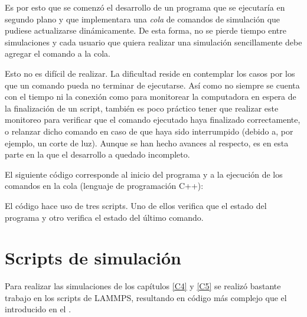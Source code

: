 Es por esto que se comenzó el desarrollo de un programa que se ejecutaría en segundo plano y que implementara una \textit{cola} de comandos de simulación que pudiese actualizarse dinámicamente. De esta forma, no se pierde tiempo entre simulaciones y cada usuario que quiera realizar una simulación sencillamente debe agregar el comando a la cola.

Esto no es difícil de realizar. La dificultad reside en contemplar los casos por los que un comando pueda no terminar de ejecutarse. Así como no siempre se cuenta con el tiempo ni la conexión como para monitorear la computadora en espera de la finalización de un script, también es poco práctico tener que realizar este monitoreo para verificar que el comando ejecutado haya finalizado correctamente, o relanzar dicho comando en caso de que haya sido interrumpido (debido a, por ejemplo, un corte de luz). Aunque se han hecho avances al respecto, es en esta parte en la que el desarrollo a quedado incompleto.

El siguiente código corresponde al inicio del programa y a la ejecución de los comandos en la cola (lenguaje de programación C++):



El código hace uso de tres scripts. Uno de ellos verifica que el estado del programa y otro verifica el estado del último comando.




\section{Scripts de simulación}

Para realizar las simulaciones de los capítulos \ref{C4} y \ref{C5} se realizó bastante trabajo en los scripts de LAMMPS, resultando en código más complejo que el introducido en el .

